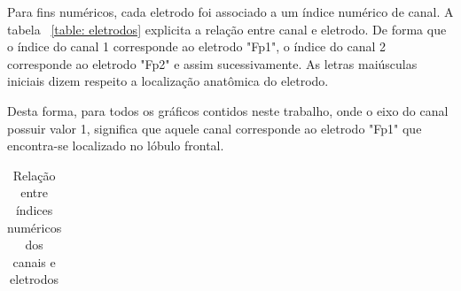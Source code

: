 \documentclass[
	12pt,				%
	openright,			%
	twoside,			%
	a4paper,			%
	english,			%
	french,				%
	spanish,			%
	brazil				%
	]{abntex2}
\begin{document}
Para fins numéricos, cada eletrodo foi associado a um índice numérico de canal. A tabela ~\ref{table: eletrodos} explicita a relação entre canal e eletrodo. De forma que o índice do canal 1 corresponde ao eletrodo "Fp1", o índice do canal 2 corresponde ao eletrodo "Fp2" e assim sucessivamente. As letras maiúsculas iniciais dizem respeito a localização anatômica do eletrodo. 

Desta forma, para todos os gráficos contidos neste trabalho, onde o eixo do canal possuir valor 1, significa que aquele canal corresponde ao eletrodo "Fp1" que encontra-se localizado no lóbulo frontal.

\begin{table}[h]
\caption{Relação entre índices numéricos dos canais e eletrodos}
\centering
\begin{tabular}{cclll}


\end{tabular}
\end{table}
\end{document}
